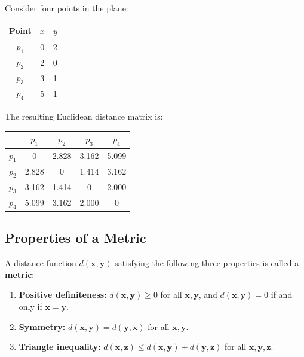 \begin{example}
Consider four points in the plane:

\begin{center}
\begin{tabularx}{0.4\textwidth}{c c c}
\toprule
Point & $x$ & $y$ \\
\midrule
$p_1$ & 0 & 2 \\
$p_2$ & 2 & 0 \\
$p_3$ & 3 & 1 \\
$p_4$ & 5 & 1 \\
\bottomrule
\end{tabularx}
\end{center}

The resulting Euclidean distance matrix is:

\begin{center}
\begin{tabular}{c | c c c c}
\toprule
 & $p_1$ & $p_2$ & $p_3$ & $p_4$ \\
\midrule
$p_1$ & 0 & 2.828 & 3.162 & 5.099 \\
$p_2$ & 2.828 & 0 & 1.414 & 3.162 \\
$p_3$ & 3.162 & 1.414 & 0 & 2.000 \\
$p_4$ & 5.099 & 3.162 & 2.000 & 0 \\
\bottomrule
\end{tabular}
\end{center}
\end{example}

\subsection{Properties of a Metric}

A distance function $d(\mathbf{x}, \mathbf{y})$ satisfying the following three properties is called a \textbf{metric}:

\begin{enumerate}
  \item \textbf{Positive definiteness:} $d(\mathbf{x}, \mathbf{y}) \geq 0$ for all $\mathbf{x}, \mathbf{y}$, and $d(\mathbf{x}, \mathbf{y}) = 0$ if and only if $\mathbf{x} = \mathbf{y}$.
  \item \textbf{Symmetry:} $d(\mathbf{x}, \mathbf{y}) = d(\mathbf{y}, \mathbf{x})$ for all $\mathbf{x}, \mathbf{y}$.
  \item \textbf{Triangle inequality:} $d(\mathbf{x}, \mathbf{z}) \leq d(\mathbf{x}, \mathbf{y}) + d(\mathbf{y}, \mathbf{z})$ for all $\mathbf{x}, \mathbf{y}, \mathbf{z}$.
\end{enumerate}

